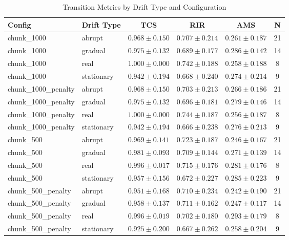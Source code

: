 \begin{table}[ht]
\centering
\caption{Transition Metrics by Drift Type and Configuration}
\label{tab:transition_metrics}
\begin{tabular}{llcccc}
\toprule
Config & Drift Type & TCS & RIR & AMS & N \\
\midrule
chunk_1000 & abrupt & $0.968 \pm 0.150$ & $0.707 \pm 0.214$ & $0.261 \pm 0.187$ & 21 \\
chunk_1000 & gradual & $0.975 \pm 0.132$ & $0.689 \pm 0.177$ & $0.286 \pm 0.142$ & 14 \\
chunk_1000 & real & $1.000 \pm 0.000$ & $0.742 \pm 0.188$ & $0.258 \pm 0.188$ & 8 \\
chunk_1000 & stationary & $0.942 \pm 0.194$ & $0.668 \pm 0.240$ & $0.274 \pm 0.214$ & 9 \\
\midrule
chunk_1000_penalty & abrupt & $0.968 \pm 0.150$ & $0.703 \pm 0.213$ & $0.266 \pm 0.186$ & 21 \\
chunk_1000_penalty & gradual & $0.975 \pm 0.132$ & $0.696 \pm 0.181$ & $0.279 \pm 0.146$ & 14 \\
chunk_1000_penalty & real & $1.000 \pm 0.000$ & $0.744 \pm 0.187$ & $0.256 \pm 0.187$ & 8 \\
chunk_1000_penalty & stationary & $0.942 \pm 0.194$ & $0.666 \pm 0.238$ & $0.276 \pm 0.213$ & 9 \\
\midrule
chunk_500 & abrupt & $0.969 \pm 0.141$ & $0.723 \pm 0.187$ & $0.246 \pm 0.167$ & 21 \\
chunk_500 & gradual & $0.981 \pm 0.093$ & $0.709 \pm 0.144$ & $0.271 \pm 0.139$ & 14 \\
chunk_500 & real & $0.996 \pm 0.017$ & $0.715 \pm 0.176$ & $0.281 \pm 0.176$ & 8 \\
chunk_500 & stationary & $0.957 \pm 0.156$ & $0.672 \pm 0.227$ & $0.285 \pm 0.223$ & 9 \\
\midrule
chunk_500_penalty & abrupt & $0.951 \pm 0.168$ & $0.710 \pm 0.234$ & $0.242 \pm 0.190$ & 21 \\
chunk_500_penalty & gradual & $0.958 \pm 0.137$ & $0.711 \pm 0.162$ & $0.247 \pm 0.117$ & 14 \\
chunk_500_penalty & real & $0.996 \pm 0.019$ & $0.702 \pm 0.180$ & $0.293 \pm 0.179$ & 8 \\
chunk_500_penalty & stationary & $0.925 \pm 0.200$ & $0.667 \pm 0.262$ & $0.258 \pm 0.204$ & 9 \\
\bottomrule
\end{tabular}
\end{table}